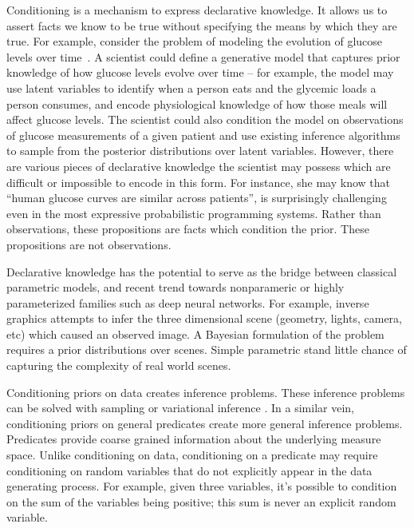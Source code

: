 
Conditioning is a mechanism to express declarative knowledge.
It allows us to assert facts we know to be true without specifying the means by which they are true.
For example, consider the problem of modeling the evolution of glucose levels over time~\citep{levine2017offline}.
A scientist could define a generative model that captures prior knowledge of how glucose levels evolve over time -- for example, the model may use latent variables to identify when a person eats and the glycemic loads a person consumes, and encode physiological knowledge of how those meals will affect glucose levels.
The scientist could also condition the model on observations of glucose measurements of a given patient and use existing inference algorithms to sample from the posterior distributions over latent variables.
However, there are various pieces of declarative knowledge the scientist may possess which are difficult or impossible to encode in this form.
For instance, she may know that ``human glucose curves are similar across patients'',   is surprisingly challenging even in the most expressive probabilistic programming systems. 
Rather than observations, these propositions are facts which condition the prior. These propositions are not observations.

Declarative knowledge has the potential to serve as the bridge between classical parametric models, and recent trend towards nonparameric or highly parameterized families such as deep neural networks.
For example, inverse graphics attempts to infer the three dimensional scene (geometry, lights, camera, etc) which caused an observed image.
A Bayesian formulation of the problem requires a prior distributions over scenes.
Simple parametric stand little chance of capturing the complexity of real world scenes.

Conditioning priors on data creates inference problems. These inference
problems can be solved with sampling \citep{andrieu2003introduction} or variational 
inference \citep{jordan1999introduction, ranganath2014black}.
In a similar vein, conditioning priors on general predicates create
more general inference problems. Predicates provide coarse grained
information about the underlying measure space. Unlike conditioning on
data, conditioning on a predicate may require conditioning on random
variables that do not explicitly appear in the data generating process.
For example, given three variables, it's possible to condition on the sum
of the variables being positive; this sum is never an explicit random variable.

